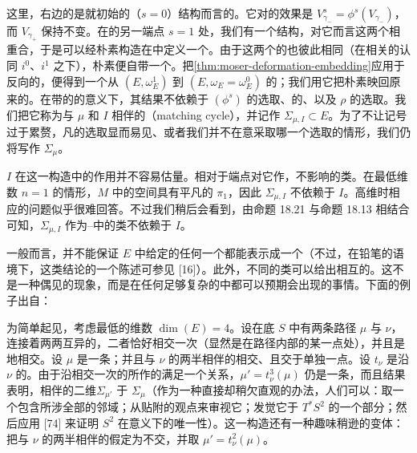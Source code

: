 这里，右边的\trParallelTransport{}是就初始的（$s=0$）结构而言的。它对\trVanishingCycle{}的效果是 $V^s_{\gamma_-}=\phi^s(V_{\gamma_-})$，而 $V_{\gamma_+}$ 保持不变。在\trDeformation{}的另一端点 $s=1$ 处，我们有一个\trExact\trLefschetzFibration{}结构，对它而言这两个\trVanishingCycle{}相重合，于是可以经朴素\trMatchingCycle{}构造在\trTotalSpace{}中定义一个\trLagrange\trSphere。由于这两个\trVanishingCycle{}的\trFrame{}也彼此相同（在相关\trVectorSpace{}的认同 $i^0$、$i^1$ 之下），朴素\trMatchingCycle{}便自带一个\trFrame。把\cref{thm:moser-deformation-embedding}应用于反向的\trDeformation，便得到一个从 $(E,\omega^1_E)$ 到 $(E,\omega_E=\omega^0_E)$ 的\trConformallySymplectic{}\trEmbedding；我们用它把朴素\trMatchingCycle{}映回原来的\trSymplecticForm。在带\trFrame{}的\trExact\trLagrange\trSphere{}的\trIsotopy{}意义下，其结果不依赖于 $(\phi^s)$ 的选取、\trLefschetzFibration{}的\trDeformation、以及 $\rho$ 的选取。我们把它称为与 $\mu$ 和 $I$ 相伴的\textbf{\trMatchingCycle}（matching cycle），并记作 $\Sigma_{\mu,I}\subset E$。为了不让记号过于累赘，凡\trIsotopy{}的选取显而易见、或者我们并不在意采取哪一个选取的情形，我们仍将写作 $\Sigma_\mu$。
\begin{remark}\label{thm:matching-isotopy-role-remark}
\trIsotopy{}$I$ 在这一构造中的作用并不容易估量。相对于端点对它作\trDeformation，不影响\trMatchingCycle{}的\trIsotopy{}类。在最低维数 $n=1$ 的情形，\trSurface{}$M$ 中\trExact\trEmbedding{}\trCircle{}的空间具有平凡的 $\pi_1$，因此 $\Sigma_{\mu,I}$ 不依赖于 $I$。高维时相应的问题似乎很难回答。不过我们稍后会看到，由命题 18.21 与命题 18.13 相结合可知，$\Sigma_{\mu,I}$ 作为\trDonaldson--\trFukayaCategory{}中\trObject{}的\trIsomorphism{}类不依赖于 $I$。
\end{remark}
一般而言，并不能保证 $E$ 中给定的任何一个\trLagrange\trSphere{}都能表示成一个\trMatchingCycle（不过，在\trLefschetz{}铅笔的语境下，这类结论的一个\trAsymptotic{}陈述可参见 [16]）。此外，不同的\trMatchingPath{}\trIsotopy{}类可以给出相互\trIsotopy{}的\trMatchingCycle。这不是一种偶见的现象，而是在任何足够复杂的\trLefschetzFibration{}中都可以预期会出现的事情。下面的例子出自\trAuroux：
\begin{example}\label{thm:auroux-matching-example}
为简单起见，考虑最低的维数 $\dim(E)=4$。设在底 $S$ 中有两条\trEmbedding{}路径 $\mu$ 与 $\nu$，连接着两两互异的\trCriticalValue，二者恰好相交一次（显然是在路径内部的某一点处），并且是\trTransverse{}地相交。设 $\mu$ 是一条\trMatchingPath；并且与 $\nu$ 的两半相伴的\trVanishingCycle{}\trTransverse{}相交、且交于单独一点。设 $t_\nu$ 是沿 $\nu$ 的\trHalfTwist。由于沿相交一次的\trCircle{}所作的\trDehnTwist{}满足一个\trBraid{}关系，$\mu'=t_\nu^3(\mu)$ 仍是一条\trMatchingPath，而且结果表明，相伴的\trLagrange{}二维\trSphere{}$\Sigma_{\mu'}$ \trIsotopy{}于 $\Sigma_\mu$（作为一种直接却稍欠直观的办法，人们可以：取一个包含所涉全部\trLefschetzThimble{}的邻域；从\trCellular{}贴附的观点来审视它；发觉它\trSymplectic\trIsomorphic{}于 $T^*S^2$ 的一个\trCompact{}部分；然后应用 [74] 来证明\trLagrange{} $S^2$ 在\trIsotopy{}意义下的唯一性）。这一构造还有一种趣味稍逊的变体：把与 $\nu$ 的两半相伴的\trVanishingCycle{}假定为不交，并取 $\mu'=t_\nu^2(\mu)$。
\end{example}
